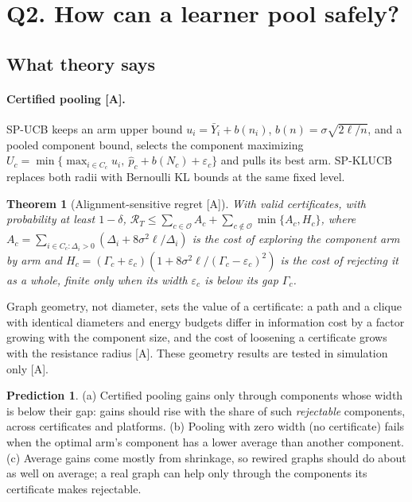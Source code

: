 \documentclass[11pt]{article}
\newtheorem{theorem}{Theorem}
\theoremstyle{definition}
\newtheorem{prediction}{Prediction}
\theoremstyle{remark}
\newcommand{\src}[1]{\textsf{[#1]}}
\begin{document}
\section{Q2. How can a learner pool safely?}\label{sec:q2}

\subsection{What theory says}

\paragraph{Certified pooling \src{A}.} SP-UCB keeps an arm upper bound $u_i=\bar Y_i+b(n_i)$, $b(n)=\sigma\sqrt{2\ell/n}$, and a pooled component bound, selects the component maximizing $U_c=\min\{\max_{i\in C_c}u_i,\ \hat p_c+b(N_c)+\varepsilon_c\}$ and pulls its best arm. SP-KLUCB replaces both radii with Bernoulli KL bounds at the same fixed level.

\begin{theorem}[Alignment-sensitive regret \src{A}]\label{thm:spucb}
With valid certificates, with probability at least $1-\delta$,
$\mathcal R_T\le\sum_{c\in\mathcal O}A_c+\sum_{c\notin\mathcal O}\min\{A_c,H_c\}$, where $A_c=\sum_{i\in C_c:\Delta_i>0}(\Delta_i+8\sigma^2\ell/\Delta_i)$ is the cost of exploring the component arm by arm and $H_c=(\Gamma_c+\varepsilon_c)(1+8\sigma^2\ell/(\Gamma_c-\varepsilon_c)^2)$ is the cost of rejecting it as a whole, finite only when its width $\varepsilon_c$ is below its gap $\Gamma_c$.
\end{theorem}

Graph geometry, not diameter, sets the value of a certificate: a path and a clique with identical diameters and energy budgets differ in information cost by a factor growing with the component size, and the cost of loosening a certificate grows with the resistance radius \src{A}. These geometry results are tested in simulation only \src{A}.

\begin{prediction}\label{pred:q2}
(a) Certified pooling gains only through components whose width is below their gap: gains should rise with the share of such \emph{rejectable} components, across certificates and platforms. (b) Pooling with zero width (no certificate) fails when the optimal arm's component has a lower average than another component. (c) Average gains come mostly from shrinkage, so rewired graphs should do about as well on average; a real graph can help only through the components its certificate makes rejectable.
\end{prediction}
\end{document}
